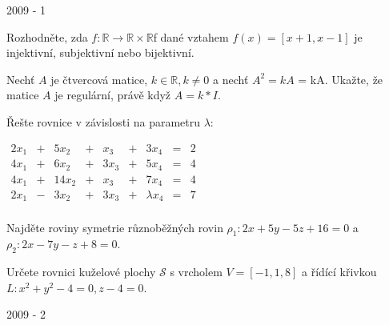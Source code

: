 
\newpage
{\large 2009 - 1}

\begin{questions}

\question Rozhodněte, zda \(f: \mathbb{R} \rightarrow \mathbb{R} \times \mathbb{R}\)f dané vztahem \(f(x) = [x+1,x-1]\) je injektivní, subjektivní nebo bijektivní.

\question Nechť \(A\) je čtvercová matice, \(k \in \mathbb{R}, k \neq 0\) a nechť \(A^2 = kA\) = kA. Ukažte, že matice \(A\) je regulární, právě když \(A = k * I\).

\newpage

\question Řešte rovnice v závislosti na parametru \(\lambda\): \\\begin{center}
    \(\begin{matrix}
        2x_1 & + & 5x_2  & + & x_3  & + & 3x_4        & = & 2\\
        4x_1 & + & 6x_2  & + & 3x_3 & + & 5x_4        & = & 4\\
        4x_1 & + & 14x_2 & + & x_3  & + & 7x_4        & = & 4\\
        2x_1 & - & 3x_2  & + & 3x_3 & + & \lambda x_4 & = & 7\\
    \end{matrix}\)
\end{center}

\question Najděte roviny symetrie různoběžných rovin \(\rho_1: 2x+5y-5z+16=0\) a \(\rho_2: 2x - 7y -z + 8 = 0\).

\newpage

\question Určete rovnici kuželové plochy \(\mathcal{S}\) s vrcholem \(V = [-1,1,8]\) a řídící křivkou \(L: x^2 + y^2 -4 = 0, z-4=0\).

\end{questions}

\newpage
{\large 2009 - 2}

